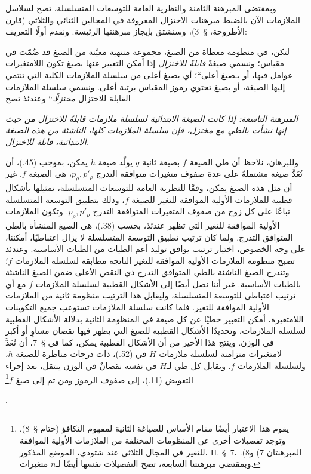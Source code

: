 \documentclass[11pt]{article}
\providecommand{\glqq}{\textquotedblbase}
\providecommand{\grqq}{\textquotedblleft}
\newcommand{\srcLTR}[1]{\relax\ifmmode\text{\mbox{\babelsublr{\foreignlanguage{english}{#1}}}}\else\babelsublr{\foreignlanguage{english}{#1}}\fi}
\newcommand{\srcfn}[2]{\begingroup\renewcommand{\thefootnote}{\srcLTR{#1}}\footnote{#2}\addtocounter{footnote}{-1}\endgroup}
\begin{document}
وبمقتضى المبرهنة الثامنة والنظرية العامة للتوسعات المتسلسلة، تصح لسلاسل الملازمات الآن بالضبط مبرهنات الاختزال المعروفة في المجالين الثنائي والثلاثي (قارن الأطروحة، \S\ 3)، وسنشتق بإيجاز مبرهنتها الرئيسة. ونقدم أولًا التعريف:

\glqq{}لتكن، في منظومة معطاة من الصيغ، مجموعة منتهية معيّنة من الصيغ قد ضُمّت في مقياس؛ ونسمي صيغةً \emph{قابلةً للاختزال} إذا أمكن التعبير عنها بصيغ تكون اللامتغيرات عوامل فيها، أو بـ\glqq{}صيغ أعلى\grqq{}؛ أي بصيغ أعلى من سلسلة الملازمات الكلية التي تنتمي إليها الصيغة، أو بصيغ تحتوي رموز المقياس برتبة أعلى. ونسمي سلسلة الملازمات القابلة للاختزال \emph{مختزلًا}.\grqq{} وعندئذ تصح

\emph{المبرهنة التاسعة: إذا كانت الصيغة الابتدائية لسلسلة ملازمات قابلةً للاختزال من حيث إنها نشأت بالطي مع مختزل، فإن سلسلة الملازمات كلها، الناشئة من هذه الصيغة الابتدائية، قابلة للاختزال.}

وللبرهان، نلاحظ أن طي الصيغة $f$ بصيغة ثانية $g$ يولّد صيغة $h$ يمكن، بموجب (45.)، أن تُعَدَّ صيغة مشتملةً على عدة صفوف متغيرات متوافقة التدرج $p_\rho,p'_\rho$، هي الصيغة $f$. غير أن مثل هذه الصيغ يمكن، وفقًا للنظرية العامة للتوسعات المتسلسلة، تمثيلها بأشكال قطبية للملازمات الأولية الموافقة للتغير للصيغة $f$، وذلك بتطبيق التوسعة المتسلسلة تباعًا على كل زوج من صفوف المتغيرات المتوافقة التدرج $p_\rho,p'_\rho$. وتكون الملازمات الأولية الموافقة للتغير التي تظهر عندئذ، بحسب (38.)، هي الصيغ المنشأة بالطي المتوافق التدرج. ولما كان ترتيب تطبيق التوسعة المتسلسلة لا يزال اعتباطيًا، أمكننا، على وجه الخصوص، اختيار ترتيب يوافق توليد أعم الطيات من الطيات الأساسية. وعندئذ تصبح منظومة الملازمات الأولية الموافقة للتغير الناتجة مطابقة لسلسلة الملازمات $f$؛ وتندرج الصيغ الناشئة بالطي المتوافق التدرج ذي النقص الأعلى ضمن الصيغ الناشئة بالطيات الأساسية. غير أننا نصل أيضًا إلى الأشكال القطبية لسلسلة الملازمات $f$ مع أي ترتيب اعتباطي للتوسعة المتسلسلة، وليقابل هذا الترتيب منظومة ثانية من الملازمات الأولية الموافقة للتغير. فلما كانت سلسلة الملازمات تستوعب جميع التكوينات اللامتغيرة، أمكن التعبير خطيًا عن كل صيغة في المنظومة الثانية بدلالة الأشكال القطبية لسلسلة الملازمات، وتحديدًا الأشكال القطبية للصيغ التي يظهر فيها نقصان مساوٍ أو أكبر في الوزن. وينتج هذا الأخير من أن الأشكال القطبية يمكن، كما في \S\ 7، أن تُعَدَّ لامتغيرات متزامنة لسلسلة ملازمات $H$ في (52.)، ذات درجات مناظرة للصيغة $h$، ولسلسلة الملازمات $f$. ويقابل كل طي لـ$H$ في نفسه نقصانٌ في الوزن ينتقل، بعد إجراء التعويض (11.)، إلى صفوف الرموز ومن ثم إلى صيغ $f$\srcfn{*)}{يقوم هذا الاعتبار أيضًا مقام الأساس للصياغة الثانية لمفهوم التكافؤ (ختام \S\ 8). وتوجد تفصيلات أخرى عن المنظومات المختلفة من الملازمات الأولية الموافقة للتغير في المجال الثلاثي عند شتودي، الموضع المذكور، II. \S\ 7، المبرهنتان 7) و8). وبمقتضى مبرهنتنا السابعة، تصح التفصيلات نفسها أيضًا لـ$n$ متغيرات.}.
\end{document}

